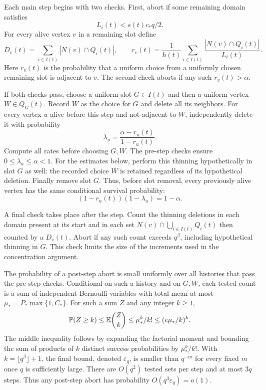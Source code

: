 Each main step begins with two checks.  First, abort if some remaining
domain satisfies
\begin{equation}\label{sel:size-barrier}
 L_i(t)<s(t)c_*q/2.
\end{equation}
For every alive vertex $v$ in a remaining slot define
\begin{equation}\label{sel:degree-hazard}
 D_v(t)=\sum_{i\in I(t)}|N(v)\cap Q_i(t)|,\qquad
 r_v(t)=\frac1{h(t)}\sum_{i\in I(t)}
            \frac{|N(v)\cap Q_i(t)|}{L_i(t)}.
\end{equation}
Here $r_v(t)$ is the probability that a uniform choice from a uniformly
chosen remaining slot is adjacent to $v$.  The second check aborts if
any such $r_v(t)>\alpha$.

If both checks pass, choose a uniform slot $G\in I(t)$ and then a
uniform vertex $W\in Q_G(t)$.  Record $W$ as the choice for $G$ and
delete all its neighbors.  For every vertex $u$ alive before this step
and not adjacent to $W$, independently delete it with probability
\begin{equation}\label{sel:thinning-rate}
 \lambda_u=\frac{\alpha-r_u(t)}{1-r_u(t)}.
\end{equation}
Compute all rates before choosing $G,W$.  The pre-step checks ensure
$0\le\lambda_u\le\alpha<1$.  For the estimates below, perform this
thinning hypothetically in slot $G$ as well: the recorded choice $W$
is retained regardless of its hypothetical deletion.  Finally remove
slot $G$.  Thus, before slot removal, every previously alive vertex
has the same conditional survival probability:
\begin{equation}\label{sel:equal-survival}
 (1-r_u(t))(1-\lambda_u)=1-\alpha.
\end{equation}

A final check takes place after the step.  Count the thinning deletions
in each domain present at its start and in each set
$N(v)\cap\bigcup_{i\in I(t)}Q_i(t)$ then counted by a $D_v(t)$.
Abort if any such count exceeds $q^\beta$, including hypothetical
thinning in $G$.  This check limits the size of the increments used
in the concentration argument.

The probability of a post-step abort is small uniformly over all
histories that pass the pre-step checks.  Conditional on such a history
and on $G,W$, each tested count is a sum of independent Bernoulli variables
with total mean at most
$\mu_*=P_*\max\{1,C_*\}$.
For such a sum $Z$ and any integer $k\ge1$,
\begin{equation}\label{sel:bernoulli-tail}
 \mathbb P(Z\ge k)\le \mathbb E\binom Zk\le\mu_*^k/k!
 \le(e\mu_*/k)^k.
\end{equation}
The middle inequality follows by expanding the factorial moment and
bounding the sum of products of $k$ distinct success probabilities
by $\mu_*^k/k!$.  With $k=\lfloor q^\beta\rfloor+1$, the final
bound, denoted $\varepsilon_q$, is smaller than $q^{-m}$ for every
fixed $m$ once $q$ is sufficiently large.  There are $O(q^2)$ tested
sets per step and at most $3q$ steps.  Thus any post-step abort has
probability $O(q^3\varepsilon_q)=o(1)$.

